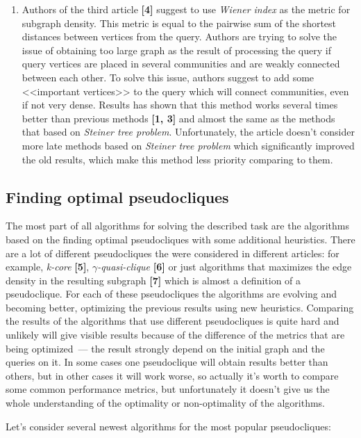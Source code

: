\documentclass[11pt,a4paper,oneside]{article}
\begin{document}
\begin{enumerate}
  \item Authors of the third article \textbf{[4]} suggest to use \textit{Wiener index} as the metric for subgraph density. This metric is equal to the pairwise sum of the shortest distances between vertices from the query. Authors are trying to solve the issue of obtaining too large graph as the result of processing the query if query vertices are placed in several communities and are weakly connected between each other. To solve this issue, authors suggest to add some <<important vertices>> to the query which will connect communities, even if not very dense. Results has shown that this method works several times better than previous methods \textbf{[1, 3]} and almost the same as the methods that based on \textit{Steiner tree problem}. Unfortunately, the article doesn't consider more late methods based on \textit{Steiner tree problem} which significantly improved the old results, which make this method less priority comparing to them.
  
\end{enumerate}

\subsection{Finding optimal pseudocliques}

The most part of all algorithms for solving the described task are the algorithms based on the finding optimal pseudocliques with some additional heuristics. There are a lot of different pseudocliques the were considered in different articles: for example, \textit{k-core} \textbf{[5]}, \textit{$\gamma$-quasi-clique} \textbf{[6]} or just algorithms that maximizes the edge density in the resulting subgraph \textbf{[7]} which is almost a definition of a pseudoclique. For each of these pseudocliques the algorithms are evolving and becoming better, optimizing the previous results using new heuristics. Comparing the results of the algorithms that use different pseudocliques is quite hard and unlikely will give visible results because of the difference of the metrics that are being optimized~--- the result strongly depend on the initial graph and the queries on it. In some cases one pseudoclique will obtain results better than others, but in other cases it will work worse, so actually it's worth to compare some common performance metrics, but unfortunately it doesn't give us the whole understanding of the optimality or non-optimality of the algorithms.

Let's consider several newest algorithms for the most popular pseudocliques:
\end{document}
